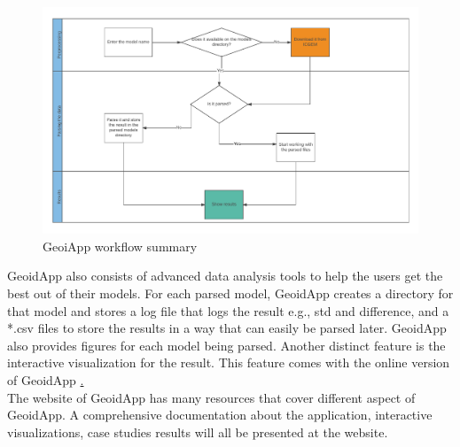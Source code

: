 \begin{figure}[t]
	\caption{GeoiApp workflow summary}
	\label{figure:flowchart}
	\includegraphics[scale=0.5]{Figures/cropped_final.pdf}
	\centering
\end{figure}

GeoidApp also consists of advanced data analysis tools to help the users get the best out of their models. For each parsed model, GeoidApp creates a directory for that model and stores a log file that logs the result e.g., std and difference, and a *.csv files to store the results in a way that can easily be parsed later. GeoidApp also provides figures for each model being parsed. Another distinct feature is the interactive visualization for the result. This feature comes with the online version of GeoidApp \href{https://geoidapp.github.io}.
\\
The website of GeoidApp has many resources that cover different aspect of GeoidApp. A comprehensive documentation about the application, interactive visualizations, case studies results will all be presented at the website.
 

